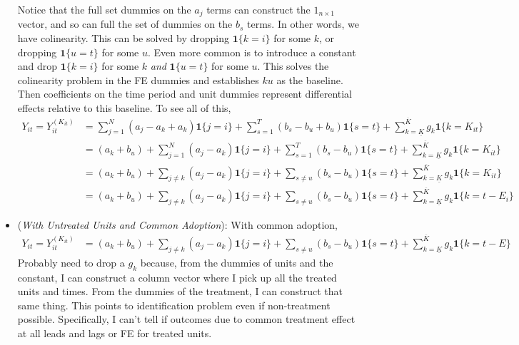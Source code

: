 \documentclass[12pt]{article}
\theoremstyle{plain}
\theoremstyle{definition}
\theoremstyle{remark}
\begin{document}
\begin{itemize}
    Notice that the full set dummies on the $a_j$ terms can construct
    the $1_{n\times 1}$ vector, and so can full the set of dummies on
    the $b_s$ terms. In other words, we have colinearity.
    This can be solved by dropping $\mathbf{1}\{k=i\}$ for some $k$, or
    dropping $\mathbf{1}\{u=t\}$ for some $u$.
    Even more common is to introduce a constant and drop
    $\mathbf{1}\{k=i\}$ for some $k$ \emph{and}
    $\mathbf{1}\{u=t\}$ for some $u$.
    This solves the colinearity problem in the FE dummies and
    establishes $ku$ as the baseline.
    Then coefficients on the time period and unit dummies represent
    differential effects relative to this baseline.
    To see all of this,
    \begin{align*}
      Y_{it}
      =
      Y_{it}^{(K_{it})}
      &=
      \sum_{j=1}^N
      (a_j-a_k+a_k)\mathbf{1}\{j=i\}
      +
      \sum_{s=1}^T
      (b_s-b_u+b_u)\mathbf{1}\{s=t\}
      +
      \sum_{k=\underline{K}}^{\overline{K}}
      g_{k}
      \mathbf{1}\{k=K_{it}\}
      \\
      &=
      (a_k + b_u)
      +
      \sum_{j=1}^N
      (a_j-a_k)\mathbf{1}\{j=i\}
      +
      \sum_{s=1}^T
      (b_s-b_u)\mathbf{1}\{s=t\}
      +
      \sum_{k=\underline{K}}^{\overline{K}}
      g_{k}
      \mathbf{1}\{k=K_{it}\}
      \\
      &=
      (a_k + b_u)
      +
      \sum_{j\neq k}
      (a_j-a_k)\mathbf{1}\{j=i\}
      +
      \sum_{s\neq u}
      (b_s-b_u)\mathbf{1}\{s=t\}
      +
      \sum_{k=\underline{K}}^{\overline{K}}
      g_{k}
      \mathbf{1}\{k=K_{it}\}
      \\
      &=
      (a_k + b_u)
      +
      \sum_{j\neq k}
      (a_j-a_k)\mathbf{1}\{j=i\}
      +
      \sum_{s\neq u}
      (b_s-b_u)\mathbf{1}\{s=t\}
      +
      \sum_{k=\underline{K}}^{\overline{K}}
      g_{k}
      \mathbf{1}\{k=t-E_{i}\}
    \end{align*}


  \item (\emph{With Untreated Units and Common Adoption}):
    With common adoption,
    \begin{align*}
      Y_{it}
      =
      Y_{it}^{(K_{it})}
      &=
      (a_k + b_u)
      +
      \sum_{j\neq k}
      (a_j-a_k)\mathbf{1}\{j=i\}
      +
      \sum_{s\neq u}
      (b_s-b_u)\mathbf{1}\{s=t\}
      +
      \sum_{k=\underline{K}}^{\overline{K}}
      g_{k}
      \mathbf{1}\{k=t-E\}
    \end{align*}
    Probably need to drop a $g_k$ because, from the dummies of units and
    the constant, I can construct a column vector where I pick up all
    the treated units and times.
    From the dummies of the treatment, I can construct that same thing.
    This points to identification problem even if non-treatment possible.
    Specifically, I can't tell if outcomes due to common treatment
    effect at all leads and lags or FE for treated units.



\end{itemize}
\end{document}
